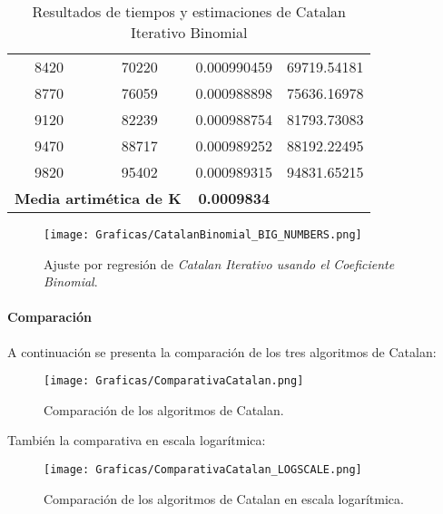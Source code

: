 \documentclass[a4paper,12pt]{article} %
\begin{document}
\begin{table}[H]
{\begin{tabular}{|c|c|c|c|}
			8420                                               & 70220                & 0.000990459              & 69719.54181                                          \\
			8770                                               & 76059                & 0.000988898              & 75636.16978                                          \\
			9120                                               & 82239                & 0.000988754              & 81793.73083                                          \\
			9470                                               & 88717                & 0.000989252              & 88192.22495                                          \\
			9820                                               & 95402                & 0.000989315              & 94831.65215                                          \\
			\hline
			\multicolumn{2}{l}{\textbf{Media artimética de K}} & \textbf{0.0009834}                                                                                     \\
			\hline
		\end{tabular}
	}
	\caption{Resultados de tiempos y estimaciones de Catalan Iterativo Binomial}
	\label{tab:tiempos}
\end{table}

\begin{figure}[H]
	\centering
	\texttt{[image: Graficas/CatalanBinomial\_BIG\_NUMBERS.png]}
	\caption{Ajuste por regresión de \textit{Catalan Iterativo usando el Coeficiente Binomial}.}
\end{figure}

\paragraph{Comparación}

A continuación se presenta la comparación de los tres algoritmos de Catalan:

\begin{figure}[H]
	\centering
	\texttt{[image: Graficas/ComparativaCatalan.png]}
	\caption{Comparación de los algoritmos de Catalan.}
\end{figure}

También la comparativa en escala logarítmica:

\begin{figure}[H]
	\centering
	\texttt{[image: Graficas/ComparativaCatalan\_LOGSCALE.png]}
	\caption{Comparación de los algoritmos de Catalan en escala logarítmica.}
\end{figure}
\end{document}
